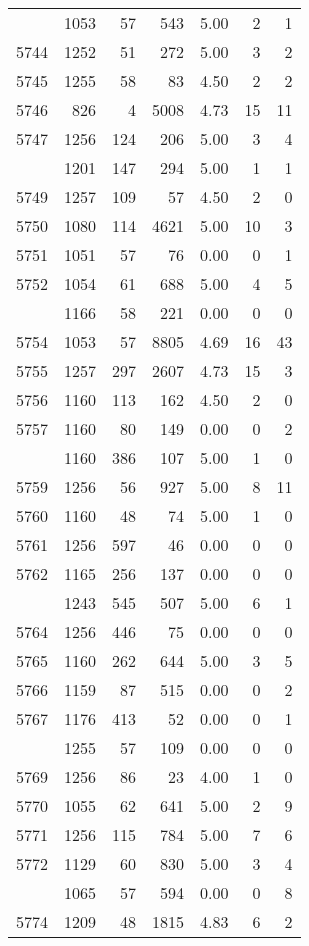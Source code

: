 \documentclass[
]{article}
\begin{document}
\begin{table}
\begin{tabular}[t]{lrrrrrr}
\addlinespace
5743 & 1053 & 57 & 543 & 5.00 & 2 & 1\\
5744 & 1252 & 51 & 272 & 5.00 & 3 & 2\\
5745 & 1255 & 58 & 83 & 4.50 & 2 & 2\\
5746 & 826 & 4 & 5008 & 4.73 & 15 & 11\\
5747 & 1256 & 124 & 206 & 5.00 & 3 & 4\\
\addlinespace
5748 & 1201 & 147 & 294 & 5.00 & 1 & 1\\
5749 & 1257 & 109 & 57 & 4.50 & 2 & 0\\
5750 & 1080 & 114 & 4621 & 5.00 & 10 & 3\\
5751 & 1051 & 57 & 76 & 0.00 & 0 & 1\\
5752 & 1054 & 61 & 688 & 5.00 & 4 & 5\\
\addlinespace
5753 & 1166 & 58 & 221 & 0.00 & 0 & 0\\
5754 & 1053 & 57 & 8805 & 4.69 & 16 & 43\\
5755 & 1257 & 297 & 2607 & 4.73 & 15 & 3\\
5756 & 1160 & 113 & 162 & 4.50 & 2 & 0\\
5757 & 1160 & 80 & 149 & 0.00 & 0 & 2\\
\addlinespace
5758 & 1160 & 386 & 107 & 5.00 & 1 & 0\\
5759 & 1256 & 56 & 927 & 5.00 & 8 & 11\\
5760 & 1160 & 48 & 74 & 5.00 & 1 & 0\\
5761 & 1256 & 597 & 46 & 0.00 & 0 & 0\\
5762 & 1165 & 256 & 137 & 0.00 & 0 & 0\\
\addlinespace
5763 & 1243 & 545 & 507 & 5.00 & 6 & 1\\
5764 & 1256 & 446 & 75 & 0.00 & 0 & 0\\
5765 & 1160 & 262 & 644 & 5.00 & 3 & 5\\
5766 & 1159 & 87 & 515 & 0.00 & 0 & 2\\
5767 & 1176 & 413 & 52 & 0.00 & 0 & 1\\
\addlinespace
5768 & 1255 & 57 & 109 & 0.00 & 0 & 0\\
5769 & 1256 & 86 & 23 & 4.00 & 1 & 0\\
5770 & 1055 & 62 & 641 & 5.00 & 2 & 9\\
5771 & 1256 & 115 & 784 & 5.00 & 7 & 6\\
5772 & 1129 & 60 & 830 & 5.00 & 3 & 4\\
\addlinespace
5773 & 1065 & 57 & 594 & 0.00 & 0 & 8\\
5774 & 1209 & 48 & 1815 & 4.83 & 6 & 2\\

\end{tabular}
\end{table}
\end{document}
